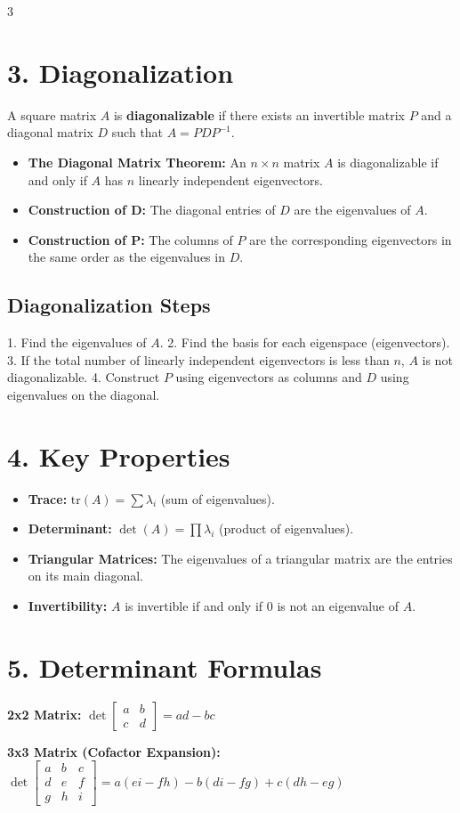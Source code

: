 \begin{multicols}{3}
\section*{3. Diagonalization}
A square matrix $A$ is \textbf{diagonalizable} if there exists an invertible matrix $P$ and a diagonal matrix $D$ such that $A = PDP^{-1}$.

\begin{itemize}
  \item \textbf{The Diagonal Matrix Theorem:} An $n \times n$ matrix $A$ is diagonalizable if and only if $A$ has $n$ linearly independent eigenvectors.
  \item \textbf{Construction of D:} The diagonal entries of $D$ are the eigenvalues of $A$.
  \item \textbf{Construction of P:} The columns of $P$ are the corresponding eigenvectors in the same order as the eigenvalues in $D$.
\end{itemize}

\subsection*{Diagonalization Steps}
1. Find the eigenvalues of $A$.
2. Find the basis for each eigenspace (eigenvectors).
3. If the total number of linearly independent eigenvectors is less than $n$, $A$ is not diagonalizable.
4. Construct $P$ using eigenvectors as columns and $D$ using eigenvalues on the diagonal.

\section*{4. Key Properties}
\begin{itemize}
  \item \textbf{Trace:} $\text{tr}(A) = \sum \lambda_i$ (sum of eigenvalues).
  \item \textbf{Determinant:} $\det(A) = \prod \lambda_i$ (product of eigenvalues).
  \item \textbf{Triangular Matrices:} The eigenvalues of a triangular matrix are the entries on its main diagonal.
  \item \textbf{Invertibility:} $A$ is invertible if and only if $0$ is not an eigenvalue of $A$.
\end{itemize}

\section*{5. Determinant Formulas}
\textbf{2x2 Matrix:}
$\det \begin{bmatrix} a & b \\ c & d \end{bmatrix} = ad - bc$

\textbf{3x3 Matrix (Cofactor Expansion):}
$\det \begin{bmatrix} a & b & c \\ d & e & f \\ g & h & i \end{bmatrix} = a(ei-fh) - b(di-fg) + c(dh-eg)$

\end{multicols}


\newpage
